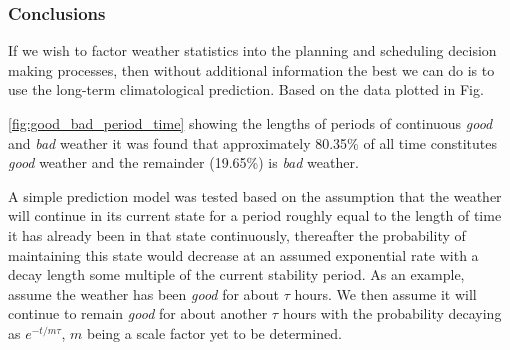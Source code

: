 \subsubsection{Conclusions}
\label{ss:conc_pred}
If we wish to factor weather statistics into the planning and scheduling decision making processes, then without additional information the best we can do is to use the long-term climatological prediction. Based on the data plotted in Fig. {\ref{fig:good_bad_period_time} showing the lengths of periods of continuous \emph{good} and \emph{bad} weather it was found that approximately  80.35\% of all time constitutes \emph{good} weather and the remainder (19.65\%) is \emph{bad} weather.

A simple prediction model was tested based on the assumption that the weather will continue in its current state for a period roughly equal to the length of time it has already been in that state continuously, thereafter the probability of maintaining this state would decrease at an assumed exponential rate with a decay length some multiple of the current stability period. As an example, assume the weather has been \emph{good} for about $\tau$ hours. We then assume it will continue to remain \emph{good} for about another $\tau$ hours with the probability decaying as $e^{-t/m\tau}$, $m$ being a scale factor yet to be determined.

}
